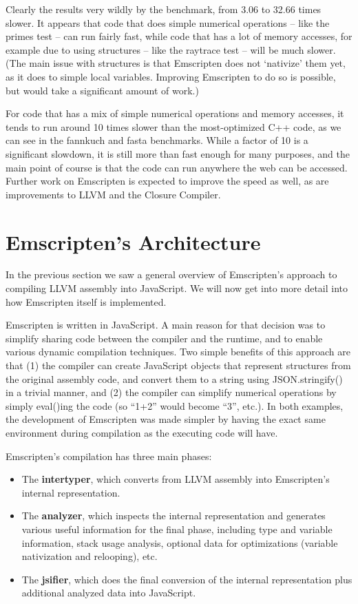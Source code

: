 \documentclass[11pt]{proc}
\begin{document}
Clearly the results very wildly by the benchmark, from 3.06 to 32.66 times
slower. It appears that code that does simple numerical operations -- like
the primes test -- can run fairly fast, while code that has a lot of memory
accesses, for example due to using structures -- like the raytrace test --
will be much slower. (The main issue with structures is that Emscripten does not
`nativize' them yet, as it does to simple local variables. Improving Emscripten to
do so is possible,
but would take a significant amount of work.)

For code that has a mix of simple numerical operations and memory accesses,
it tends to run around 10 times slower than the most-optimized C++ code,
as we can see in the fannkuch and fasta benchmarks. While a factor of 10
is a significant slowdown, it is still more than fast enough for
many purposes, and the main point of course is that the code can run
anywhere the web can be accessed. Further work on Emscripten is expected to
improve the speed as well, as are improvements to LLVM and the Closure
Compiler.

\section{Emscripten's Architecture}

In the previous section we saw a general overview of Emscripten's approach
to compiling LLVM assembly into JavaScript. We will now get into more detail
into how Emscripten itself is implemented.

Emscripten is written in JavaScript. A main reason for that decision
was to simplify sharing code between the compiler and the runtime, and
to enable various dynamic compilation techniques. Two simple benefits of this approach are that (1)
the compiler can create JavaScript objects that represent structures from the original
assembly code, and convert them to a string using JSON.stringify()
in a trivial manner,
and (2) the compiler can simplify numerical operations by simply
eval()ing the code (so ``1+2'' would become ``3'', etc.). In both examples,
the development of Emscripten was made simpler by having the exact same environment
during compilation as the executing code will have.

Emscripten's compilation has three main phases:
\begin{itemize}
\item The \textbf{intertyper}, which converts from LLVM assembly into
      Emscripten's internal representation.
\item The \textbf{analyzer}, which inspects the internal representation
      and generates various useful information for the final phase,
      including type and variable information, stack usage analysis,
      optional data for optimizations
      (variable nativization and relooping), etc.
\item The \textbf{jsifier}, which does the final conversion of the
      internal representation plus additional analyzed data into JavaScript.
\end{itemize}
\end{document}
